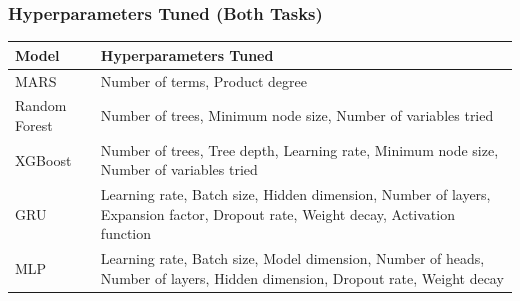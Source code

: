 \documentclass{beamer}
\begin{document}
\begin{frame}
\frametitle{Hyperparameters Tuned (Both Tasks)}
    \vspace{-0.5em} %
    \centering %
    \begin{tabular}{>{\columncolor{bgsubrown!20}}m{} >{\arraybackslash}m{}}
    \toprule
    \textbf{Model} & \textbf{Hyperparameters Tuned} \\
    \midrule
    MARS & Number of terms, Product degree \\
    \midrule
    Random Forest & Number of trees, Minimum node size, Number of variables tried \\
    \midrule
    XGBoost & Number of trees, Tree depth, Learning rate, Minimum node size, Number of variables tried \\
    \midrule
    GRU & Learning rate, Batch size, Hidden dimension, Number of layers, Expansion factor, Dropout rate, Weight decay, Activation function \\
    \midrule
    MLP & Learning rate, Batch size, Model dimension, Number of heads, Number of layers, Hidden dimension, Dropout rate, Weight decay \\
    \bottomrule
    \end{tabular}
\end{frame}
\end{document}
